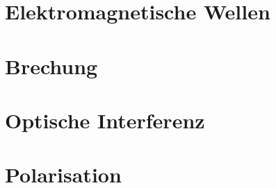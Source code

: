 \section{Elektromagnetische Wellen} \label{sec:em_wellen}


\section{Brechung} \label{sec:brechung}


\section{Optische Interferenz} \label{sec:interferenz_licht}


\section{Polarisation} \label{sec:polarisation}
